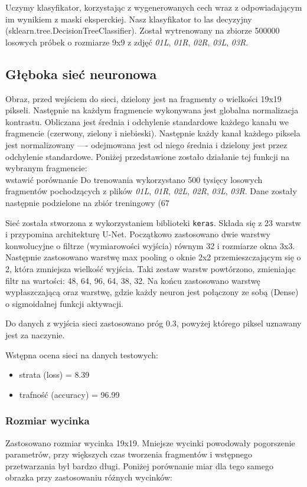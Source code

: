 \documentclass[polish,polish,a4paper]{article}
\begin{document}
			Uczymy klasyfikator, korzystając z wygenerowanych cech wraz z odpowiadającym im wynikiem z maski eksperckiej. 
			Nasz klasyfikator to las decyzyjny (sklearn.tree.DecisionTreeClassifier).
			Został wytrenowany na zbiorze 500000 losowych próbek o rozmiarze 9x9 z zdjęć 
			\textit{01L}, \textit{01R}, \textit{02R}, \textit{03L}, \textit{03R}.
		
		\subsection{Głęboka sieć neuronowa}
			Obraz, przed wejściem do sieci, dzielony jest na fragmenty o wielkości 19x19 pikseli.
Następnie na każdym fragmencie wykonywana jest globalna normalizacja kontrastu.
Obliczana jest średnia i odchylenie standardowe każdego kanału we fragmencie (czerwony, zielony i niebieski).
Następnie każdy kanał każdego piksela jest normalizowany —- odejmowana
jest od niego średnia i dzielony jest przez odchylenie standardowe.
Poniżej przedstawione zostało działanie tej funkcji na wybranym fragmencie:
\\ wstawić porównanie
Do trenowania wykorzystano 500 tysięcy losowych fragmentów pochodzących z plików \textit{01L}, \textit{01R}, \textit{02L}, \textit{02R}, \textit{03L}, \textit{03R}. Dane zostały następnie podzielone na zbiór treningowy (67%

Sieć została stworzona z wykorzystaniem biblioteki \texttt{keras}.
Składa się z 23 warstw i przypomina architekturę U-Net. 
Początkowo zastosowano dwie warstwy konwolucyjne o filtrze (wymiarowości wyjścia) równym 32 i rozmiarze okna 3x3.
Następnie zastosowano warstwę max pooling o oknie 2x2 przemieszczającym się o 2, która zmniejsza wielkość wyjścia.
Taki zestaw warstw powtórzono, zmieniając filtr na wartości: 48, 64, 96, 64, 38, 32.
Na końcu zastosowano warstwę wypłaszczającą oraz warstwę, gdzie każdy neuron jest połączony ze sobą (Dense) o sigmoidalnej funkcji aktywacji.

Do danych z wyjścia sieci zastosowano próg 0.3, powyżej którego piksel uznawany jest za naczynie.

Wstępna ocena sieci na danych testowych:
\begin{itemize}
    \item strata (loss) = 8.39%
    \item trafność (accuracy) = 96.99%
\end{itemize}

\subsubsection*{Rozmiar wycinka}
Zastosowano rozmiar wycinka 19x19. Mniejsze wycinki powodowały pogorszenie parametrów, przy większych czas tworzenia fragmentów i wstępnego przetwarzania był bardzo długi. Poniżej porównanie miar dla tego samego obrazka przy zastosowaniu różnych wycinków:
\end{document}
